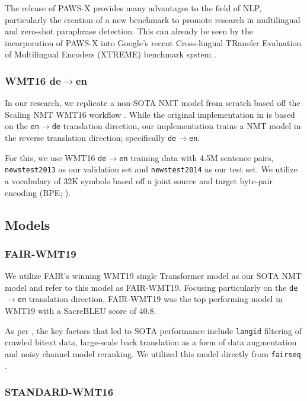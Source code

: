 \documentclass[11pt,a4paper]{article}
\begin{document}
The release of PAWS-X provides many advantages to the field of NLP, particularly
the creation of a new benchmark to promote research in multilingual and
zero-shot paraphrase detection. This can already be seen by the incorporation of
PAWS-X into Google's recent Cross-lingual TRansfer Evaluation of Multilingual
Encoders (XTREME) benchmark system \cite{hu2020xtreme}.

\subsubsection{WMT16 de$\rightarrow$en}

In our research, we replicate a non-SOTA NMT model from scratch based off the
Scaling NMT WMT16 workflow \cite{ott2018scaling}. While the original
implementation in \citet{ott2018scaling} is based on the
\texttt{en$\rightarrow$de} translation direction, our implementation trains a
NMT model in the reverse translation direction; specifically
\texttt{de$\rightarrow$en}.

For this, we use WMT16 \texttt{de$\rightarrow$en} training data with 4.5M
sentence pairs, \texttt{newstest2013} as our validation set and
\texttt{newstest2014} as our test set. We utilize a vocabulary of 32K symbols
based off a joint source and target byte-pair encoding (BPE;
\citealt{sennrich2015neural}).

\subsection{Models}

\subsubsection{FAIR-WMT19}

We utilize FAIR's winning WMT19 single Transformer model as our SOTA NMT model
and refer to this model as FAIR-WMT19. Focusing particularly on the
\texttt{de$\rightarrow$en} translation direction, FAIR-WMT19 was the top
performing model in WMT19 with a SacreBLEU \cite{post-2018-call} score of 40.8.

As per \citet{ng2019facebook}, the key factors that led to SOTA performance
include \texttt{langid} filtering of crawled bitext data, large-scale back
translation as a form of data augmentation and noisy channel model reranking. We
utilized this model directly from \texttt{fairseq} \cite{ott2019fairseq}.

\subsubsection{STANDARD-WMT16}
\end{document}
